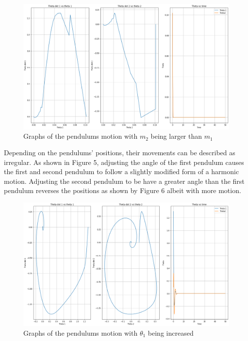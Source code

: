 \documentclass[linenumbers,RNAAS,trackchanges]{aastex631}
\begin{document}
\begin{figure}[H]
    \centering
    \centering
    \includegraphics[scale=.30]{m2.png}
    \caption{Graphs of the pendulums motion with $m_2$ being larger than $m_1$}
    \label{fig:code}
\end{figure}
Depending on the pendulums' positions, their movements can be described as irregular. As shown in Figure 5, adjusting the angle of the first pendulum causes the first and second pendulum to follow a slightly modified form of a harmonic motion. Adjusting the second pendulum to be have a greater angle than the first pendulum reverses the positions as shown by Figure 6 albeit with more motion. 
\begin{figure}[H]
    \centering
    \centering
    \includegraphics[scale=.30]{theta1.png}
    \caption{Graphs of the pendulums motion with $\theta_1$ being increased}
    \label{fig:code}
\end{figure}
\end{document}
